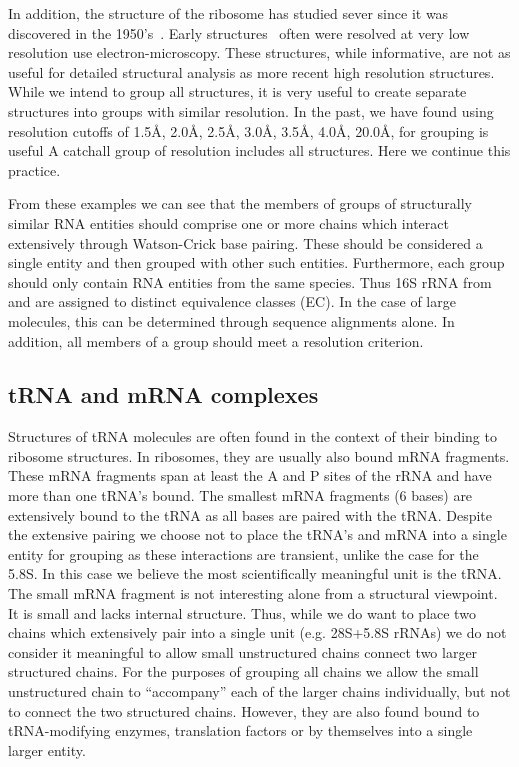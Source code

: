 In addition, the structure of the ribosome has studied sever since it was
discovered in the 1950's~\cite{McQuillen1959, BEER1960, ABDUL-NOUR1960,
OHTAKA1963, SANTER1963}. Early structures~\cite{Mueller2000} often were resolved
at very low resolution use electron-microscopy. These structures, while
informative, are not as useful for detailed structural analysis as more recent
high resolution structures. While we intend to group all structures, it is very
useful to create separate structures into groups with similar resolution. In the
past, we have found using resolution cutoffs of 1.5{\AA}, 2.0{\AA}, 2.5{\AA},
3.0{\AA}, 3.5{\AA}, 4.0{\AA}, 20.0{\AA}, for grouping is useful A catchall group
of resolution includes all structures. Here we continue this practice.

From these examples we can see that the members of groups of structurally
similar RNA entities should comprise one or more chains which interact
extensively through Watson-Crick base pairing. These should be considered a
single entity and then grouped with other such entities. Furthermore, each group
should only contain RNA entities from the same species. Thus 16S rRNA from \EC{}
and \TT{} are assigned to distinct equivalence classes (EC). In the case of
large molecules, this can be determined through sequence alignments alone. In
addition, all members of a group should meet a resolution criterion.

\subsection{tRNA and mRNA complexes}

Structures of tRNA molecules are often found in the context of their binding to
ribosome structures. In ribosomes, they are usually also bound mRNA fragments.
These mRNA fragments span at least the A and P sites of the rRNA and have more
than one tRNA's bound. The smallest mRNA fragments (6 bases) are extensively
bound to the tRNA as all bases are paired with the tRNA\@. Despite the extensive
pairing we choose not to place the tRNA's and mRNA into a single entity for
grouping as these interactions are transient, unlike the case for the 5.8S. In
this case we believe the most scientifically meaningful unit is the tRNA\@. The
small mRNA fragment is not interesting alone from a structural viewpoint. It is
small and lacks internal structure. Thus, while we do want to place two chains
which extensively pair into a single unit (e.g. 28S+5.8S rRNAs) we do not
consider it meaningful to allow small unstructured chains connect two larger
structured chains. For the purposes of grouping all chains we allow the small
unstructured chain to ``accompany'' each of the larger chains individually, but
not to connect the two structured chains. However, they are also found bound to
tRNA-modifying enzymes, translation factors or by themselves into a single
larger entity.

